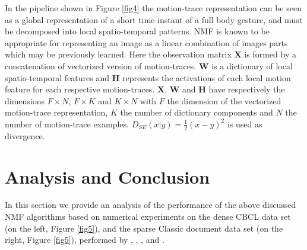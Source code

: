 \documentclass[11pt]{article}
\begin{document}
In the pipeline shown in Figure \ref{fig4} the motion-trace representation can be seen as a global representation of a short time instant of a full body gesture, and must be decomposed into local spatio-temporal patterns. NMF is known to be appropriate for representing an image as a linear combination of images parts which may be previously learned. Here the observation matrix $\mathbf{X}$ is formed by a concatenation of vectorized version of motion-traces. $\mathbf{W}$ is a dictionary of local spatio-temporal features and $\mathbf{H}$ represents the activations of each local motion feature for each respective motion-traces. $\mathbf{X}$, $\mathbf{W}$ and $\mathbf{H}$ have respectively the dimensions $F \times N$, $F \times K$ and $K \times N$ with $F$ the dimension of the vectorized motion-trace representation, $K$ the number of dictionary components and $N$ the number of motion-trace examples. $D_{SE}(x|y) = \frac{1}{2}(x-y)^2$ is used as divergence.

\section{Analysis and Conclusion} \label{analysis}

In this section we provide an analysis of the performance of the above discussed NMF algorithms based on numerical experiments on the dense CBCL data set (on the left, Figure \ref{fig5}), and the sparse Classic document data set (on the right, Figure \ref{fig5}), performed by \cite{p22}, \cite{f63}, \cite{f47}, and \cite{11}. 
\end{document}
